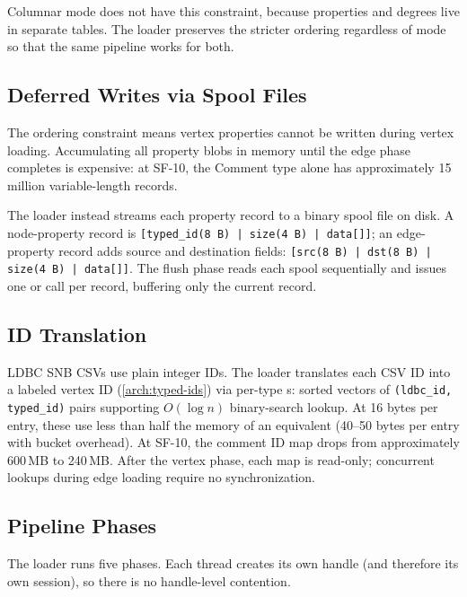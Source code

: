 Columnar mode does not have this constraint, because properties and degrees live in separate tables.
The loader preserves the stricter ordering regardless of mode so that the same pipeline works for both.

\subsection{Deferred Writes via Spool Files}
\label{arch:prop-bulk:spool}

The ordering constraint means vertex properties cannot be written during vertex loading.
Accumulating all property blobs in memory until the edge phase completes is expensive: at SF-10, the Comment type alone has approximately 15 million variable-length records.

The loader instead streams each property record to a binary spool file on disk.
A node-property record is \texttt{[typed\_id(8\,B)\,|\,size(4\,B)\,|\,data[]]};
an edge-property record adds source and destination fields: \texttt{[src(8\,B)\,|\,dst(8\,B)\,|\,size(4\,B)\,|\,data[]]}.
The flush phase reads each spool sequentially and issues one  or  call per record, buffering only the current record.

\subsection{ID Translation}
\label{arch:prop-bulk:id-map}

LDBC SNB CSVs use plain integer IDs.
The loader translates each CSV ID into a labeled vertex ID (\autoref{arch:typed-ids}) via per-type s: sorted vectors of \texttt{(ldbc\_id, typed\_id)} pairs supporting $O(\log n)$ binary-search lookup.
At 16 bytes per entry, these use less than half the memory of an equivalent  (40--50 bytes per entry with bucket overhead).
At SF-10, the comment ID map drops from approximately 600\,MB to 240\,MB.
After the vertex phase, each map is read-only; concurrent lookups during edge loading require no synchronization.

\subsection{Pipeline Phases}
\label{arch:prop-bulk:phases}

The loader runs five phases.
Each thread creates its own  handle (and therefore its own \wt{} session), so there is no handle-level contention.

